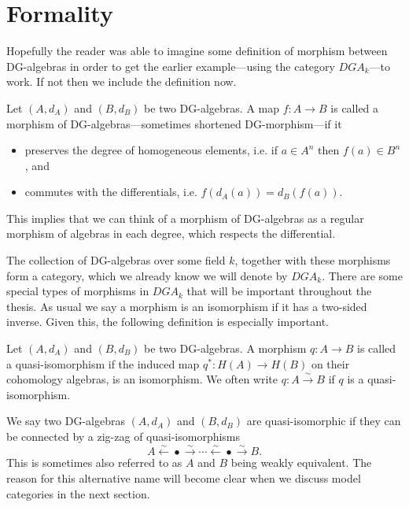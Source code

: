 \section{Formality}
\label{sec:formality}

Hopefully the reader was able to imagine some definition of morphism between DG-algebras in order to get the earlier example---using the category $DGA_k$---to work. If not then we include the definition now. 

\begin{definition}[DG-morphism]
\label{def:dg-morphism}
Let $(A, d_A)$ and $(B, d_B)$ be two DG-algebras. A map $f:A\longrightarrow B$ is called a morphism of DG-algebras---sometimes shortened DG-morphism---if it
\begin{itemize}
    \item preserves the degree of homogeneous elements, i.e. if $a\in A^n$ then $f(a)\in B^n$, and
    \item commutes with the differentials, i.e. $f(d_A(a))=d_B(f(a))$. 
\end{itemize}
\end{definition}

This implies that we can think of a morphism of DG-algebras as a regular morphism of algebras in each degree, which respects the differential.

The collection of DG-algebras over some field $k$, together with these morphisms form a category, which we already know we will denote by $DGA_k$. There are some special types of morphisms in $DGA_k$ that will be important throughout the thesis. As usual we say a morphism is an isomorphism if it has a two-sided inverse. Given this, the following definition is especially important. 

\begin{definition}
\label{def:quasi-isomorphism}
Let $(A, d_A)$ and $(B, d_B)$ be two DG-algebras. A morphism $q:A\longrightarrow B$ is called a quasi-isomorphism if the induced map $q^*:H(A)\longrightarrow H(B)$ on their cohomology algebras, is an isomorphism. We often write $q:A\overset{\sim}\longrightarrow B$ if $q$ is a quasi-isomorphism. 
\end{definition}

\begin{definition}
\label{def:quasi-isomorphic}
We say two DG-algebras $(A, d_A)$ and $(B, d_B)$ are quasi-isomorphic if they can be connected by a zig-zag of quasi-isomorphisms 
\begin{equation*}
    A \overset{\sim}\longleftarrow \bullet \overset{\sim}\longrightarrow \cdots \overset{\sim}\longleftarrow \bullet \overset{\sim}\longrightarrow B .
\end{equation*}
This is sometimes also referred to as $A$ and $B$ being weakly equivalent. The reason for this alternative name will become clear when we discuss model categories in the next section. 
\end{definition}

